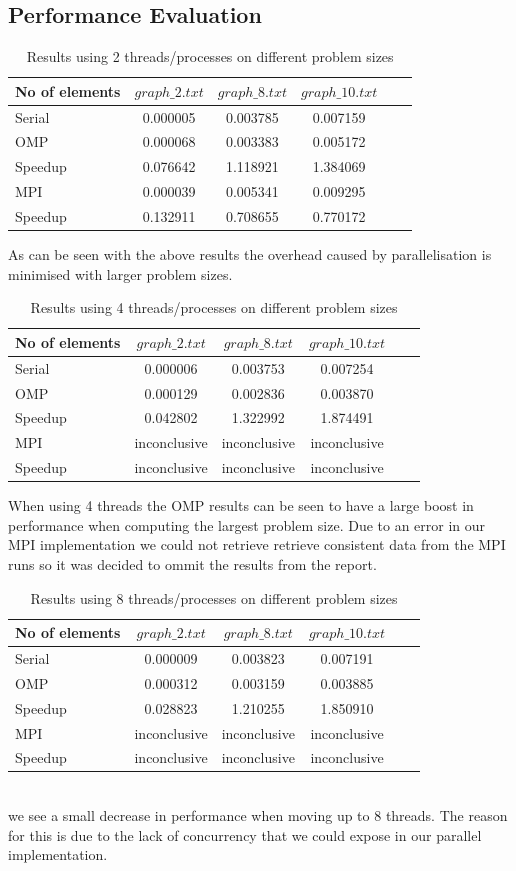 \subsection{Performance Evaluation}
\begin{table}[htb]
	\centering
	\caption{Results using 2 threads/processes on different problem sizes}
	\begin{tabular}{l|ccccc}
		\toprule
		No of elements& $graph\_2.txt$ & $graph\_8.txt$ & $graph\_10.txt$\\
		\midrule
		Serial 	&0.000005	&0.003785&0.007159\\
		OMP 	&0.000068	&0.003383&0.005172\\
		Speedup &0.076642	&1.118921&1.384069\\
		MPI 	&0.000039	&0.005341&0.009295\\
		Speedup &0.132911	&0.708655&0.770172\\
		\bottomrule
	\end{tabular}
\end{table}
As can be seen with the above results the overhead caused by parallelisation is minimised with larger problem sizes.  
\begin{table}[htb]
	\centering
	\caption{Results using 4 threads/processes on different problem sizes}
	\begin{tabular}{l|ccccc}
		\toprule
		No of elements& $graph\_2.txt$ & $graph\_8.txt$ & $graph\_10.txt$\\
		\midrule
		Serial 	&0.000006		&0.003753&0.007254\\
		OMP 	&0.000129		&0.002836&0.003870\\
		Speedup &0.042802		&1.322992&1.874491\\
		MPI 	&inconclusive	&inconclusive&inconclusive\\
		Speedup &inconclusive	&inconclusive&inconclusive\\
		\bottomrule
	\end{tabular}
\end{table}
\pagebreak
When using 4 threads the OMP results can be seen to have a large boost in performance when computing the largest problem size. Due to an error in our MPI implementation we could not retrieve retrieve consistent data from the MPI runs so it was decided to ommit the results from the report.
\begin{table}[htb]
	\centering
	\caption{Results using 8 threads/processes on different problem sizes}
	\begin{tabular}{l|ccccc}
		\toprule
		No of elements& $graph\_2.txt$ & $graph\_8.txt$ & $graph\_10.txt$\\
		\midrule
		Serial 	&0.000009		&0.003823&0.007191\\
		OMP 	&0.000312		&0.003159&0.003885\\
		Speedup &0.028823		&1.210255&1.850910\\
		MPI 	&inconclusive	&inconclusive&inconclusive\\
		Speedup &inconclusive	&inconclusive&inconclusive\\
		\bottomrule
	\end{tabular}
\end{table}
\\we see a small decrease in performance when moving up to 8 threads. The reason for this is due to the lack of concurrency that we could expose in our parallel implementation. 
 
